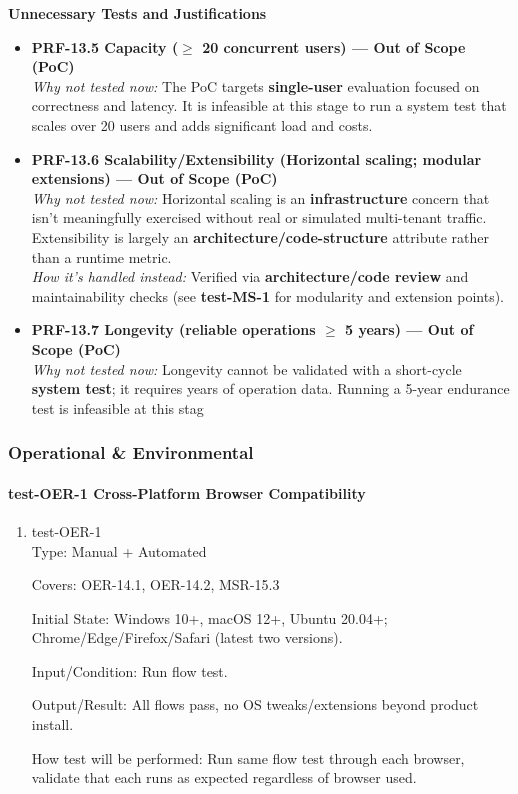 \documentclass[12pt, titlepage]{article}
\begin{document}
\noindent\textbf{Unnecessary Tests and Justifications}
\begin{itemize}
\item \textbf{PRF-13.5 Capacity ($\geq$ 20 concurrent users) — Out of Scope (PoC)}\\
\emph{Why not tested now:} The PoC targets \textbf{single-user} evaluation focused on correctness and latency. It is infeasible at this stage to run a system test that scales over 20 users and adds significant load and costs.
\item \textbf{PRF-13.6 Scalability/Extensibility (Horizontal scaling; modular extensions) — Out of Scope (PoC)}\\
\emph{Why not tested now:} Horizontal scaling is an \textbf{infrastructure} concern that isn’t meaningfully exercised without real or simulated multi-tenant traffic. Extensibility is largely an \textbf{architecture/code-structure} attribute rather than a runtime metric.\\
\emph{How it’s handled instead:} Verified via \textbf{architecture/code review} and maintainability checks (see \textbf{test-MS-1} for modularity and extension points).
\item \textbf{PRF-13.7 Longevity (reliable operations $\geq$ 5 years) — Out of Scope (PoC)}\\
\emph{Why not tested now:} Longevity cannot be validated with a short-cycle \textbf{system test}; it requires years of operation data. Running a 5-year endurance test is infeasible at this stag
\end{itemize}

\subsubsection{Operational \& Environmental}

\paragraph{test-OER-1 Cross-Platform Browser Compatibility}

\begin{enumerate}
\item{test-OER-1\\}
Type: Manual + Automated

Covers: OER-14.1, OER-14.2, MSR-15.3

Initial State: Windows 10+, macOS 12+, Ubuntu 20.04+; Chrome/Edge/Firefox/Safari (latest two versions).

Input/Condition: Run flow test.

Output/Result: All flows pass, no OS tweaks/extensions beyond product install.

How test will be performed: Run same flow test through each browser, validate that each runs as expected regardless of browser used.
\end{enumerate}
\end{document}
